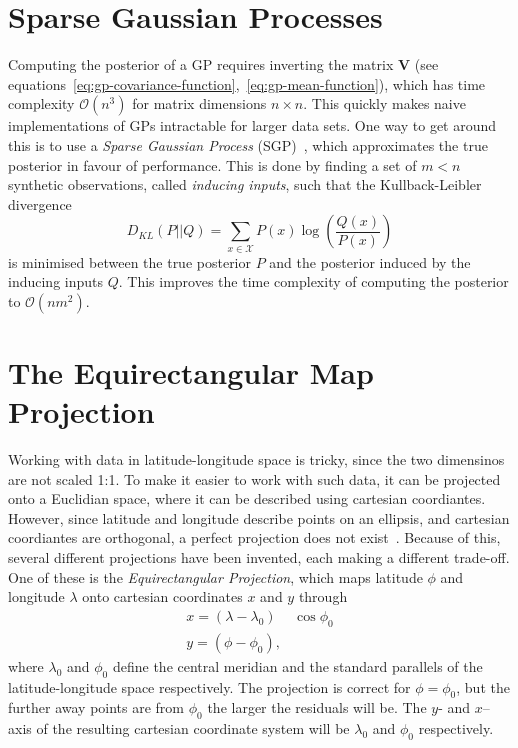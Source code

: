 \section{Sparse Gaussian Processes}
Computing the posterior of a GP requires inverting the matrix
$\textbf{V}$ (see
equations~\ref{eq:gp-covariance-function},~\ref{eq:gp-mean-function}),
which has time complexity $\mathcal{O}(n^3)$ for matrix dimensions
$n \times n$. This quickly makes naive implementations of GPs
intractable for larger data sets. One way to get around this is to use
a \textit{Sparse Gaussian Process}
(SGP)~\cite{titsias2009variational}, which approximates the true
posterior in favour of performance. This is done by finding a set of
$m < n$ synthetic observations, called \textit{inducing inputs}, such that the
Kullback-Leibler divergence
\begin{equation}
  \label{eq:kl-divergence}
  D_{KL} (P \vert\vert Q) = \sum_{x \in \mathcal{X}} P(x) \log \left(
    \frac{Q(x)}{P(x)} \right)
\end{equation}
is minimised between the true posterior $P$ and the posterior induced
by the inducing inputs $Q$. This improves the time complexity of
computing the posterior to $\mathcal{O}(nm^2)$.

\section{The Equirectangular Map Projection}
Working with data in latitude-longitude space is tricky, since the two
dimensinos are not scaled 1:1. To make it easier to work with such
data, it can be projected onto a Euclidian space, where it can be
described using cartesian coordiantes. However, since latitude and
longitude describe points on an ellipsis, and cartesian coordiantes are
orthogonal, a perfect projection does not
exist~\cite{snyder1989album}. Because of this, several different
projections have been invented, each making a different trade-off.
One of these is the \textit{Equirectangular Projection}, which maps
latitude $\phi$ and longitude $\lambda$ onto cartesian coordinates $x$
and $y$ through
\begin{equation}
  \label{eq:equirectangular-projection}
  \begin{split}
    x = (\lambda - \lambda_0)&
    \cos \phi_0 \\
    y = (\phi - \phi_0),
  \end{split}
\end{equation}
where $\lambda_0$ and $\phi_0$ define the
central meridian and the standard parallels of the latitude-longitude
space respectively. The projection is
correct for $\phi = \phi_0$, but the further away points are from
$\phi_0$ the larger the residuals will be. The $y$- and $x$--axis of
the resulting cartesian coordinate system will be $\lambda_0$ and
$\phi_0$ respectively.
